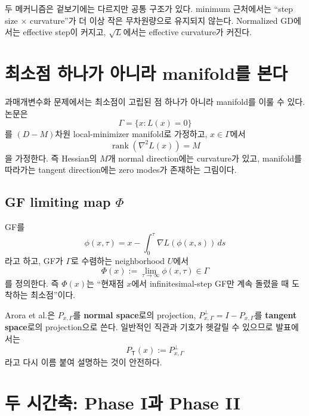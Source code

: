 \documentclass[11pt,a4paper,oneside,openany]{memoir}
\newcommand{\grad}{\nabla}
\newcommand{\Hess}{\nabla^2}
\newcommand{\T}{\mathsf{T}}
\DeclareMathOperator{\rank}{rank}
\theoremstyle{definition}
\begin{document}
\begin{keybox}
두 메커니즘은 겉보기에는 다르지만 공통 구조가 있다.
minimum 근처에서는 ``step size $\times$ curvature''가 더 이상 작은 무차원량으로 유지되지 않는다.
Normalized GD에서는 effective step이 커지고, $\sqrt L$에서는 effective curvature가 커진다.
\end{keybox}

\section{최소점 하나가 아니라 manifold를 본다}

과매개변수화 문제에서는 최소점이 고립된 점 하나가 아니라 manifold를 이룰 수 있다.
논문은
\begin{equation}
  \Gamma=\{x:L(x)=0\}
\end{equation}
를 $(D-M)$차원 local-minimizer manifold로 가정하고, $x\in\Gamma$에서
\begin{equation}
  \rank(\Hess L(x))=M
\end{equation}
을 가정한다.
즉 Hessian의 $M$개 normal direction에는 curvature가 있고,
manifold를 따라가는 tangent direction에는 zero modes가 존재하는 그림이다.

\subsection{GF limiting map \texorpdfstring{$\Phi$}{Phi}}

GF를
\begin{equation}
  \phi(x,\tau)
  =x-\int_0^\tau \grad L(\phi(x,s))\,ds
\end{equation}
라고 하고, GF가 $\Gamma$로 수렴하는 neighborhood $U$에서
\begin{equation}
  \boxed{\Phi(x):=\lim_{\tau\to\infty}\phi(x,\tau)\in\Gamma}
\end{equation}
를 정의한다.
즉 $\Phi(x)$는 ``현재점 $x$에서 infinitesimal-step GF만 계속 돌렸을 때 도착하는 최소점''이다.

\begin{paperbox}
Arora et al.은 $P_{x,\Gamma}$를 \textbf{normal space}로의 projection,
$P_{x,\Gamma}^{\perp}=I-P_{x,\Gamma}$를 \textbf{tangent space}로의 projection으로 쓴다.
일반적인 직관과 기호가 헷갈릴 수 있으므로 발표에서는
\[
  P_{\T}(x):=P_{x,\Gamma}^{\perp}
\]
라고 다시 이름 붙여 설명하는 것이 안전하다.
\end{paperbox}

\section{두 시간축: Phase I과 Phase II}
\end{document}
